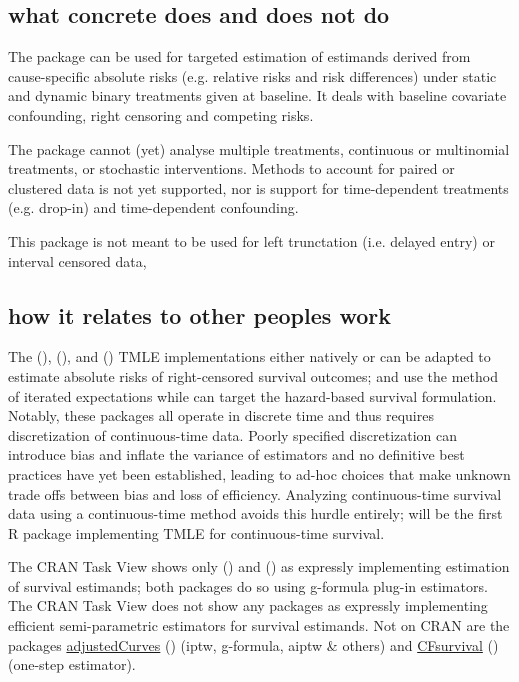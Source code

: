 \documentclass{report}
\newcommand{\1}{\ensuremath{\mathbf{1}}}
\begin{document}
\subsection{what concrete does and does not do}
\label{sec:orgdec2e8b}
The package can be used for targeted estimation of estimands derived from cause-specific absolute risks (e.g. relative risks and risk differences) under static and dynamic binary treatments given at baseline. It deals with baseline covariate confounding, right censoring and competing risks.

The package cannot (yet) analyse multiple treatments, continuous or multinomial treatments, or stochastic interventions. Methods to account for paired or clustered data is not yet supported, nor is support for time-dependent treatments (e.g. drop-in) and time-dependent confounding.

This package is not meant to be used for left trunctation (i.e. delayed entry) or interval censored data, 

\subsection{how it relates to other peoples work}
\label{sec:org21ac530}

The  (\cite{schwab_ltmle_2020}),  (\cite{sofrygin_stremr_2017}), and  (\cite{benkeser_survtmle_2019}) TMLE implementations either natively or can be adapted to estimate absolute risks of right-censored survival outcomes;  and  use the method of iterated expectations while  can target the hazard-based survival formulation. Notably, these packages all operate in discrete time and thus requires discretization of continuous-time data. Poorly specified discretization can introduce bias and inflate the variance of estimators and no definitive best practices have yet been established, leading to ad-hoc choices that make unknown trade offs between bias and loss of efficiency. Analyzing continuous-time survival data using a continuous-time method avoids this hurdle entirely;  will be the first R package implementing TMLE for continuous-time survival.

The  CRAN Task View shows only  (\cite{gerds_riskregression_2022}) and  (\cite{wallace_dtrreg_2020}) as expressly implementing estimation of survival estimands; both packages do so using g-formula plug-in estimators. The  CRAN Task View does not show any packages as expressly implementing efficient semi-parametric estimators for survival estimands. Not on CRAN are the packages \href{https://github.com/RobinDenz1/adjustedCurves}{adjustedCurves} (\cite{denz_comparison_2022}) (iptw, g-formula, aiptw \& others) and \href{https://github.com/tedwestling/CFsurvival}{CFsurvival} (\cite{westling_inference_2021}) (one-step estimator). 
\end{document}

